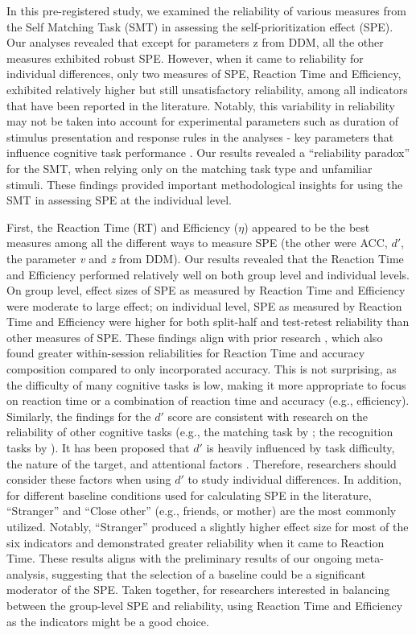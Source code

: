 \documentclass[sn-apa]{sn-jnl}%
\theoremstyle{thmstyleone}%
\theoremstyle{thmstyletwo}%
\theoremstyle{thmstylethree}%
\begin{document}
In this pre-registered study, we examined the reliability of various measures from the Self Matching Task (SMT) in assessing the self-prioritization effect (SPE). Our analyses revealed that except for parameters z from DDM, all the other measures exhibited robust SPE. However, when it came to reliability for individual differences, only two measures of SPE, Reaction Time and Efficiency, exhibited relatively higher but still unsatisfactory reliability, among all indicators that have been reported in the literature. Notably, this variability in reliability may not be taken into account for experimental parameters such as duration of stimulus presentation and response rules in the analyses - key parameters that influence cognitive task performance \parencite{hedge2018reliability}. Our results revealed a ``reliability paradox” for the SMT, when relying only on the matching task type and unfamiliar stimuli. These findings provided important methodological insights for using the SMT in assessing SPE at the individual level. 

First, the Reaction Time (RT) and Efficiency ($\eta$) appeared to be the best measures among all the different ways to measure SPE (the other were ACC, $d'$, the parameter \textit{v} and \textit{z} from DDM). Our results revealed that the Reaction Time and Efficiency performed relatively well on both group level and individual levels. On group level, effect sizes of SPE as measured by Reaction Time and Efficiency were moderate to large effect; on individual level, SPE as measured by Reaction Time and Efficiency were higher for both split-half and test-retest reliability than other measures of SPE. These findings align with prior research \parencite{hughes2014alternatives,draheim2016combining}, which also found greater within-session reliabilities for Reaction Time and accuracy composition compared to only incorporated accuracy. This is not surprising, as the difficulty of many cognitive tasks is low, making it more appropriate to focus on reaction time or a combination of reaction time and accuracy (e.g., efficiency). Similarly, the findings for the $d'$ score are consistent with research on the reliability of other cognitive tasks (e.g., the matching task by \textcite{smithson2024measuring}; the recognition tasks by \textcite{franks2016reliability}). It has been proposed that $d'$ is heavily influenced by task difficulty, the nature of the target, and attentional factors \parencite{vermeiren2012validity}. Therefore, researchers should consider these factors when using $d'$ to study individual differences. In addition, for different baseline conditions used for calculating SPE in the literature, ``Stranger” and ``Close other” (e.g., friends, or mother) are the most commonly utilized. Notably, ``Stranger” produced a slightly higher effect size for most of the six indicators and demonstrated greater reliability when it came to Reaction Time. These results aligns with the preliminary results of our ongoing meta-analysis, suggesting that the selection of a baseline could be a significant moderator of the SPE. Taken together, for researchers interested in balancing between the group-level SPE and reliability, using Reaction Time and Efficiency as the indicators might be a good choice. 
\end{document}
